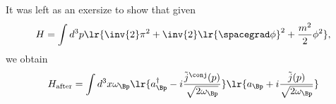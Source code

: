 

It was left as an exersize to show that given
\begin{equation}\label{eqn:qftLecture13:120}
H = \int d^3 p \lr{ \inv{2} \pi^2 + \inv{2} \lr{ \spacegrad \phi}^2 + \frac{m^2}{2} \phi^2 },
\end{equation}
we obtain
\begin{equation}\label{eqn:qftLecture13:140}
H_{\text{after}} =
\int d^3 x \omega_\Bp
\lr{ a_\Bp^\dagger - i \frac{\tilde{j}^\conj(p)}{\sqrt{2 \omega_\Bp}} }
\lr{ a_\Bp + i \frac{\tilde{j}(p)}{\sqrt{2 \omega_\Bp}} }
\end{equation}


